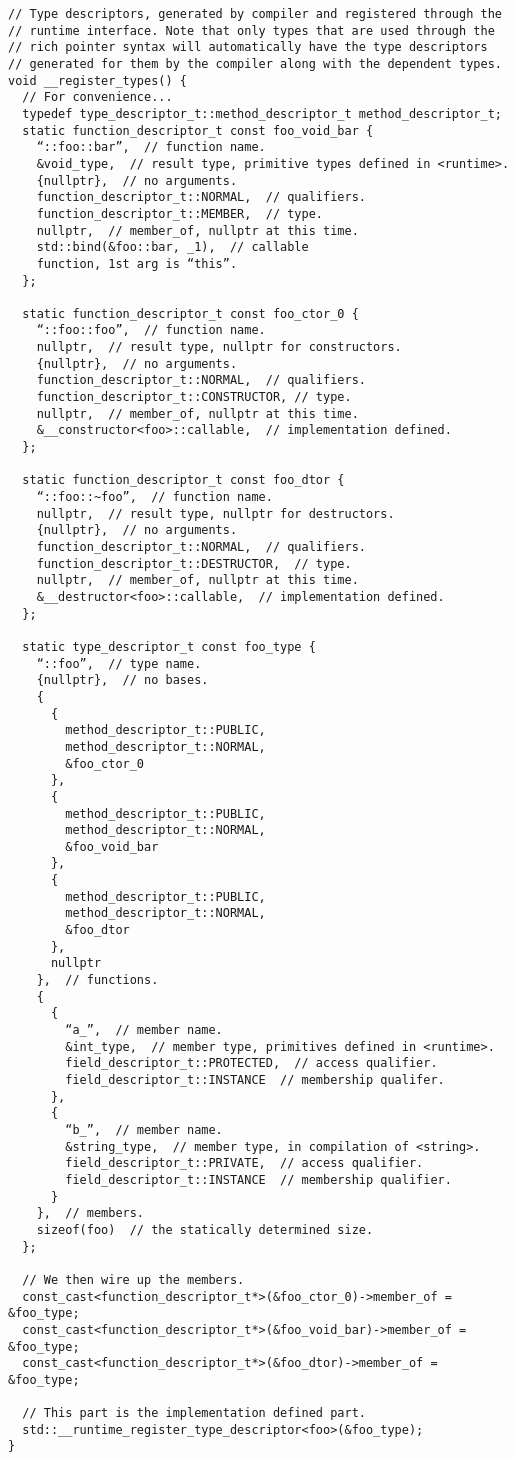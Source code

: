 \begin{verbatim}
// Type descriptors, generated by compiler and registered through the
// runtime interface. Note that only types that are used through the
// rich pointer syntax will automatically have the type descriptors
// generated for them by the compiler along with the dependent types.
void __register_types() {
  // For convenience...
  typedef type_descriptor_t::method_descriptor_t method_descriptor_t;
  static function_descriptor_t const foo_void_bar {
    “::foo::bar”,  // function name.
    &void_type,  // result type, primitive types defined in <runtime>.
    {nullptr},  // no arguments.
    function_descriptor_t::NORMAL,  // qualifiers.
    function_descriptor_t::MEMBER,  // type.
    nullptr,  // member_of, nullptr at this time.
    std::bind(&foo::bar, _1),  // callable
    function, 1st arg is “this”.
  };

  static function_descriptor_t const foo_ctor_0 {
    “::foo::foo”,  // function name.
    nullptr,  // result type, nullptr for constructors.
    {nullptr},  // no arguments.
    function_descriptor_t::NORMAL,  // qualifiers.
    function_descriptor_t::CONSTRUCTOR, // type.
    nullptr,  // member_of, nullptr at this time.
    &__constructor<foo>::callable,  // implementation defined.
  };

  static function_descriptor_t const foo_dtor {
    “::foo::~foo”,  // function name.
    nullptr,  // result type, nullptr for destructors.
    {nullptr},  // no arguments.
    function_descriptor_t::NORMAL,  // qualifiers.
    function_descriptor_t::DESTRUCTOR,  // type.
    nullptr,  // member_of, nullptr at this time.
    &__destructor<foo>::callable,  // implementation defined.
  };

  static type_descriptor_t const foo_type {
    “::foo”,  // type name.
    {nullptr},  // no bases.
    {
      {
        method_descriptor_t::PUBLIC,
        method_descriptor_t::NORMAL,
        &foo_ctor_0
      },
      {
        method_descriptor_t::PUBLIC,
        method_descriptor_t::NORMAL,
        &foo_void_bar
      }, 
      {
        method_descriptor_t::PUBLIC,
        method_descriptor_t::NORMAL,
        &foo_dtor
      },
      nullptr
    },  // functions.
    {
      {
        “a_”,  // member name.
        &int_type,  // member type, primitives defined in <runtime>.
        field_descriptor_t::PROTECTED,  // access qualifier.
        field_descriptor_t::INSTANCE  // membership qualifer.
      },
      {
        “b_”,  // member name.
        &string_type,  // member type, in compilation of <string>.
        field_descriptor_t::PRIVATE,  // access qualifier.
        field_descriptor_t::INSTANCE  // membership qualifier.
      }
    },  // members.
    sizeof(foo)  // the statically determined size.
  };

  // We then wire up the members.
  const_cast<function_descriptor_t*>(&foo_ctor_0)->member_of = &foo_type;
  const_cast<function_descriptor_t*>(&foo_void_bar)->member_of = &foo_type;
  const_cast<function_descriptor_t*>(&foo_dtor)->member_of = &foo_type;

  // This part is the implementation defined part.
  std::__runtime_register_type_descriptor<foo>(&foo_type);
}
\end{verbatim}

